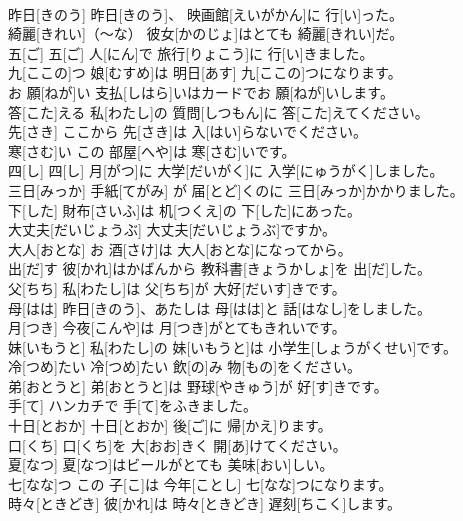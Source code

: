 \documentclass[8pt]{extreport}
\begin{document}
\begin{CJK}{UTF8}{min}
\\	昨日[きのう]	昨日[きのう]、 映画館[えいがかん]に 行[い]った。		
\\	綺麗[きれい]（～な）	彼女[かのじょ]はとても 綺麗[きれい]だ。		
\\	五[ご]	五[ご] 人[にん]で 旅行[りょこう]に 行[い]きました。		
\\	九[ここの]つ	娘[むすめ]は 明日[あす] 九[ここの]つになります。		
\\	お 願[ねが]い	支払[しはら]いはカードでお 願[ねが]いします。		
\\	答[こた]える	私[わたし]の 質問[しつもん]に 答[こた]えてください。		
\\	先[さき]	ここから 先[さき]は 入[はい]らないでください。		
\\	寒[さむ]い	この 部屋[へや]は 寒[さむ]いです。		
\\	四[し]	四[し] 月[がつ]に 大学[だいがく]に 入学[にゅうがく]しました。		
\\	三日[みっか]	手紙[てがみ] が 届[とど]くのに 三日[みっか]かかりました。		
\\	下[した]	財布[さいふ]は 机[つくえ]の 下[した]にあった。		
\\	大丈夫[だいじょうぶ]	大丈夫[だいじょうぶ]ですか。		
\\	大人[おとな]	お 酒[さけ]は 大人[おとな]になってから。		
\\	出[だ]す	彼[かれ]はかばんから 教科書[きょうかしょ]を 出[だ]した。		
\\	父[ちち]	私[わたし]は 父[ちち]が 大好[だいす]きです。		
\\	母[はは]	昨日[きのう]、あたしは 母[はは]と 話[はなし]をしました。		
\\	月[つき]	今夜[こんや]は 月[つき]がとてもきれいです。		
\\	妹[いもうと]	私[わたし]の 妹[いもうと]は 小学生[しょうがくせい]です。		
\\	冷[つめ]たい	冷[つめ]たい 飲[の]み 物[もの]をください。		
\\	弟[おとうと]	弟[おとうと]は 野球[やきゅう]が 好[す]きです。		
\\	手[て]	ハンカチで 手[て]をふきました。		
\\	十日[とおか]	十日[とおか] 後[ご]に 帰[かえ]ります。		
\\	口[くち]	口[くち]を 大[おお]きく 開[あ]けてください。		
\\	夏[なつ]	夏[なつ]はビールがとても 美味[おい]しい。		
\\	七[なな]つ	この 子[こ]は 今年[ことし] 七[なな]つになります。		
\\	時々[ときどき]	彼[かれ]は 時々[ときどき] 遅刻[ちこく]します。		

\end{CJK}
\end{document}

